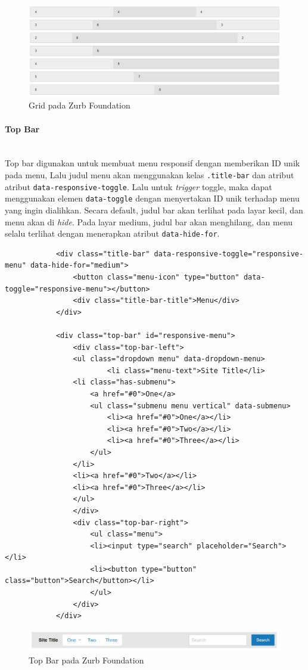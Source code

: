 \documentclass[a4paper,twoside]{article}
\newcommand{\myparagraph}[1]{\paragraph{#1}\mbox{}\\}
\begin{document}
\begin{enumerate}
		\begin{figure} [H]
			\centering  
			\includegraphics[scale=0.7]{gridbasic_zurb.png}  
			\caption{Grid pada Zurb Foundation}	 
		\end{figure}
	
		\myparagraph{Top Bar}
		Top bar digunakan untuk membuat menu responsif dengan memberikan ID unik pada menu, Lalu judul menu akan menggunakan kelas \colorbox{mygray}{\texttt{.title-bar}} dan atribut atribut \texttt{data-responsive-toggle}. Lalu untuk \textit{trigger} toggle, maka dapat menggunakan elemen \colorbox{mygray}{\texttt{data-toggle}} dengan menyertakan ID unik terhadap menu yang ingin dialihkan.
		Secara default, judul bar akan terlihat pada layar kecil, dan menu akan di \textit{hide}. Pada layar medium, judul bar akan menghilang, dan menu selalu terlihat dengan menerapkan atribut \colorbox{mygray}{\texttt{data-hide-for}}.
		
		\begin{lstlisting}
			<div class="title-bar" data-responsive-toggle="responsive-menu" data-hide-for="medium">
				<button class="menu-icon" type="button" data-toggle="responsive-menu"></button>
				<div class="title-bar-title">Menu</div>
			</div>
			
			<div class="top-bar" id="responsive-menu">
				<div class="top-bar-left">
				<ul class="dropdown menu" data-dropdown-menu>
						<li class="menu-text">Site Title</li>
				<li class="has-submenu">
					<a href="#0">One</a>
					<ul class="submenu menu vertical" data-submenu>
						<li><a href="#0">One</a></li>
						<li><a href="#0">Two</a></li>
						<li><a href="#0">Three</a></li>
					</ul>
				</li>
				<li><a href="#0">Two</a></li>
				<li><a href="#0">Three</a></li>
				</ul>
				</div>
				<div class="top-bar-right">
					<ul class="menu">
					<li><input type="search" placeholder="Search"></li>
					<li><button type="button" class="button">Search</button></li>
					</ul>
				</div>
			</div>
		\end{lstlisting}
	
		\begin{figure} [H]
		\centering  
		\includegraphics[scale=0.7]{topbar_zurb.png}  
		\caption{Top Bar pada Zurb Foundation}	 
		\end{figure}
		

\end{enumerate}
\end{document}
